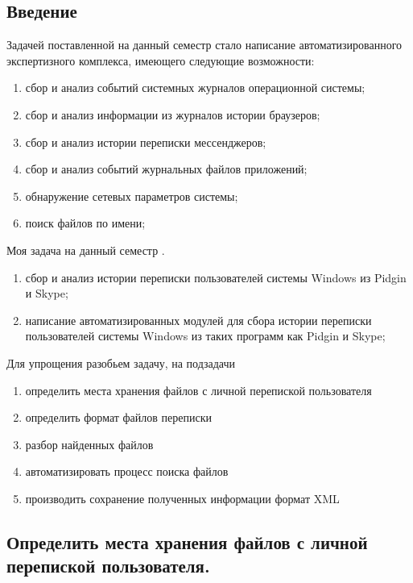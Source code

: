 \newpage

\subsection{Введение}

Задачей поставленной на данный семестр стало написание автоматизированного экспертизного комплекса, имеющего следующие возможности: 

\begin{enumerate}
\item сбор и анализ событий системных журналов операционной системы;
\item сбор и анализ информации из журналов истории браузеров;
\item сбор и анализ истории переписки мессенджеров;
\item сбор и анализ событий журнальных файлов приложений;
\item обнаружение сетевых параметров системы;
\item поиск файлов по имени;
\end{enumerate}

Моя задача на данный семестр . 

\begin{enumerate}
\item сбор и анализ истории переписки пользователей системы Windows из Pidgin и Skype;
\item написание автоматизированных модулей для сбора истории переписки пользователей системы Windows из таких программ как Pidgin и Skype;
\end{enumerate}

Для упрощения разобьем задачу, на подзадачи
\begin{enumerate}
\item определить места хранения файлов с личной перепиской пользователя
\item определить формат файлов переписки
\item разбор найденных файлов
\item автоматизировать процесс поиска файлов
\item производить сохранение полученных информации формат XML
\end{enumerate}

\subsection{Определить места хранения файлов с личной перепиской пользователя.}

